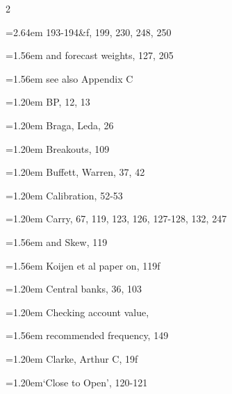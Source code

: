{\begin{multicols}{2}
\par \noindent\hangindent=2.64em\hspace*{1.44em} 193-194\&f, 199, 230, 248, 250
\par \noindent\hangindent=1.56em\hspace*{0.36em} and forecast weights, 127, 205
\par \noindent\hangindent=1.56em\hspace*{0.36em} see also Appendix C
\par \noindent\hangindent=1.20em\hspace*{0.00em} BP, 12, 13
\par \noindent\hangindent=1.20em\hspace*{0.00em} Braga, Leda, 26
\par \noindent\hangindent=1.20em\hspace*{0.00em} Breakouts, 109
\par \noindent\hangindent=1.20em\hspace*{0.00em} Buffett, Warren, 37, 42
\par \noindent\hangindent=1.20em\hspace*{0.00em} Calibration, 52-53
\par \noindent\hangindent=1.20em\hspace*{0.00em} Carry, 67, 119, 123, 126, 127-128, 132, 247
\par \noindent\hangindent=1.56em\hspace*{0.36em} and Skew, 119
\par \noindent\hangindent=1.56em\hspace*{0.36em} Koijen et al paper on, 119f
\par \noindent\hangindent=1.20em\hspace*{0.00em} Central banks, 36, 103
\par \noindent\hangindent=1.20em\hspace*{0.00em} Checking account value,
\par \noindent\hangindent=1.56em\hspace*{0.36em} recommended frequency, 149
\par \noindent\hangindent=1.20em\hspace*{0.00em} Clarke, Arthur C, 19f
\par \noindent\hangindent=1.20em\hspace*{0.00em}‘Close to Open’, 120-121

\end{multicols}}
